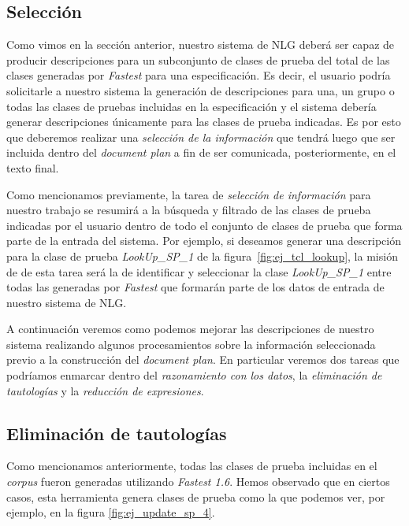 \subsection*{Selección}
Como vimos en la sección anterior, nuestro sistema de NLG deberá ser capaz de producir descripciones para un subconjunto de clases de prueba del total de las clases generadas por \emph{Fastest} para una especificación. Es decir, el usuario podría solicitarle a nuestro sistema la generación de descripciones para una, un grupo o todas las clases de pruebas incluidas en la especificación y el sistema debería generar descripciones únicamente para las clases de prueba indicadas. Es por esto que deberemos realizar una \emph{selección de la información} que tendrá luego que ser incluida dentro del \textit{document plan} a fin de ser comunicada, posteriormente, en el texto final.

Como mencionamos previamente, la tarea de \emph{selección de información} para nuestro trabajo se resumirá a la búsqueda y filtrado de las clases de prueba indicadas por el usuario dentro de todo el conjunto de clases de prueba que forma parte de la entrada del sistema. Por ejemplo, si deseamos generar una descripción para la clase de prueba \emph{LookUp\_SP\_1} de la figura~\ref{fig:ej_tcl_lookup}, la misión de de esta tarea será la de identificar y seleccionar la clase \emph{LookUp\_SP\_1} entre todas las generadas por \emph{Fastest} que formarán parte de los datos de entrada de nuestro sistema de NLG.


A continuación veremos como podemos mejorar las descripciones de nuestro sistema realizando algunos procesamientos sobre la información seleccionada previo a la construcción del \textit{document plan}. En particular veremos dos tareas que podríamos enmarcar dentro del \emph{razonamiento con los datos}, la \emph{eliminación de tautologías} y la \emph{reducción de expresiones}. 


\subsection*{Eliminación de tautologías}
Como mencionamos anteriormente, todas las clases de prueba incluidas en el \emph{corpus} fueron generadas utilizando \emph{Fastest 1.6}. Hemos observado que en ciertos casos, esta herramienta genera clases de prueba como la que podemos ver, por ejemplo, en la figura \ref{fig:ej_update_sp_4}.

